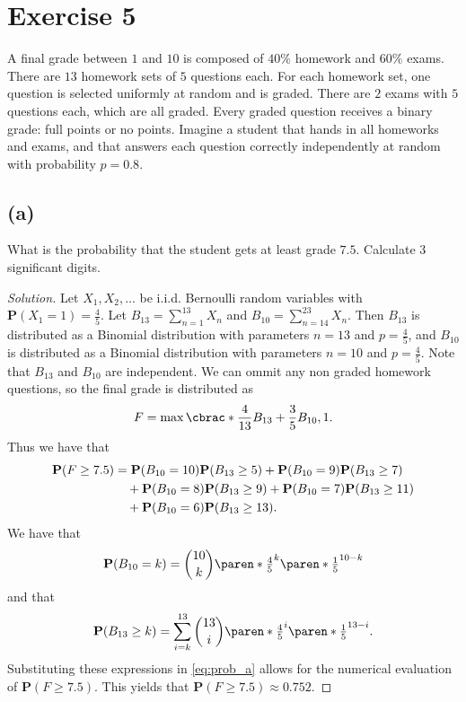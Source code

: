 \documentclass[10pt, a4paper, twoside]{amsart}
\DeclarePairedDelimiter\cbrac\{\}
\DeclarePairedDelimiter\paren()
\renewcommand{\P}{\ensuremath{\mathbf{P}}}
\newenvironment{solution}
               {\let\oldqedsymbol=\qedsymbol
                \renewcommand{\qedsymbol}{$\blacktriangleleft$}
                \begin{proof}[Solution]}
               {\end{proof}
                \renewcommand{\qedsymbol}{\oldqedsymbol}}
\begin{document}
\section*{Exercise 5}
A final grade between $1$ and $10$ is composed of $40\%$ homework
and $60\%$ exams. There are $13$ homework sets of $5$ questions each. For
each homework set, one question is selected uniformly at random and is
graded. There are $2$ exams with $5$ questions each, which are all graded.
Every graded question receives a binary grade: full points or no points.
Imagine a student that hands in all homeworks and exams, and that answers 
each question correctly independently at random with probability $p = 0.8$.
\subsection*{(a)}
What is the probability that the student gets at least grade $7.5$.
Calculate $3$ significant digits.
\begin{solution}
Let $X_1,X_2,\ldots$ be i.i.d. Bernoulli random variables with $\P(X_1=1)=\tfrac{4}{5}$.
Let $B_{13}=\sum_{n=1}^{13}X_n$ and $B_{10}=\sum_{n=14}^{23} X_n$.
Then $B_{13}$ is distributed as a Binomial distribution with parameters $n=13$ and $p=\tfrac{4}{5}$,
and $B_{10}$ is distributed as a Binomial distribution with parameters $n=10$ and $p=\tfrac{4}{5}$.
Note that $B_{13}$ and $B_{10}$ are independent.
We can ommit any non graded homework questions, so the final grade is distributed as 
\begin{equation*}
F=\max\cbrac*{\frac{4}{13}B_{13}+\frac{3}{5} B_{10},1}. 
\end{equation*}
Thus we have that 
\begin{equation}\label{eq:prob_a}
\begin{aligned}
  \P(F \geq 7.5)&=\P(B_{10} = 10)\P(B_{13} \geq 5)+\P(B_{10} = 9)\P(B_{13} \geq 7) \\
 & \hspace{1 em} +\P(B_{10} = 8)\P(B_{13} \geq 9)+\P(B_{10} = 7)\P(B_{13} \geq 11) \\
 & \hspace{1 em} +\P(B_{10} = 6)\P(B_{13} \geq 13).
 \end{aligned}
\end{equation}
We have that 
\begin{equation*}
\P(B_{10} = k)=\binom{10}{k}\paren*{\tfrac{4}{5}}^{k}\paren*{\tfrac{1}{5}}^{10-k} 
\end{equation*}
and that 
\begin{equation*}
\P(B_{13} \geq k)=\sum_{i=k}^{13}\binom{13}{i}\paren*{\tfrac{4}{5}}^{i}\paren*{\tfrac{1}{5}}^{13-i}. 
\end{equation*}
Substituting these expressions in \cref{eq:prob_a} allows for the numerical evaluation of $\P(F \geq 7.5)$.
This yields that $\P(F \geq 7.5)\approx 0.752$.
\end{solution}
\end{document}
